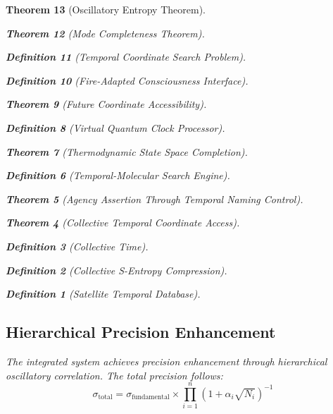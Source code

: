 \documentclass[12pt,a4paper]{article}
\newtheorem{theorem}{Theorem}[section]
\newtheorem{definition}[theorem]{Definition}
\begin{document}
\begin{theorem}[Oscillatory Entropy Theorem]
\begin{theorem}[Mode Completeness Theorem]
\begin{enumerate}
\begin{definition}[Temporal Coordinate Search Problem]
\begin{algorithm}
\begin{definition}[Fire-Adapted Consciousness Interface]
\begin{theorem}[Future Coordinate Accessibility]
\begin{definition}[Virtual Quantum Clock Processor]
\begin{itemize}
\begin{itemize}
\begin{theorem}[Thermodynamic State Space Completion]
\begin{definition}[Temporal-Molecular Search Engine]
\begin{theorem}[Agency Assertion Through Temporal Naming Control]
\begin{remark}
\begin{theorem}[Collective Temporal Coordinate Access]
\begin{definition}[Collective Time]
\begin{definition}[Collective S-Entropy Compression]
\begin{definition}[Satellite Temporal Database]
\begin{algorithm}
\begin{table}[h]
{{\subsection{Hierarchical Precision Enhancement}

The integrated system achieves precision enhancement through hierarchical oscillatory correlation. The total precision follows:
$$\sigma_{\text{total}} = \sigma_{\text{fundamental}} \times \prod_{i=1}^{n}(1 + \alpha_i\sqrt{N_i})^{-1}$$

\begin{figure}[h]
\centering
{}
\end{figure}}}
\end{table}
\end{algorithm}
\end{definition}
\end{definition}
\end{definition}
\end{theorem}
\end{remark}
\end{theorem}
\end{definition}
\end{theorem}
\end{itemize}
\end{itemize}
\end{definition}
\end{theorem}
\end{definition}
\end{algorithm}
\end{definition}
\end{enumerate}
\end{theorem}
\end{theorem}
\end{document}
